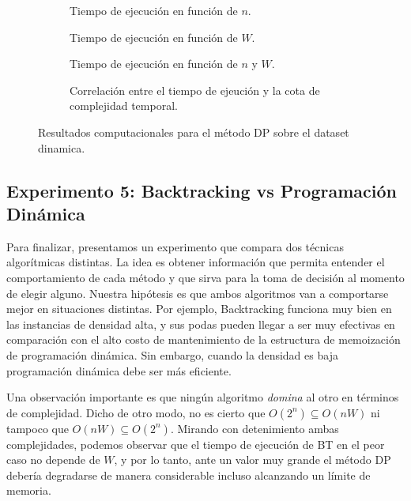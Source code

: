 \documentclass[10pt,a4paper]{article}
\begin{document}
\begin{figure}
    \centering
    \begin{subfigure}{0.45\linewidth}
        \centering
        
        \caption{Tiempo de ejecución en función de $n$.}
        \label{fig:dp-n}
    \end{subfigure}
    \begin{subfigure}{0.45\linewidth}
        \centering
        
        \caption{Tiempo de ejecución en función de $W$.}
        \label{fig:dp-W}
    \end{subfigure}
    \begin{subfigure}{0.45\linewidth}
        \centering
        
        \caption{Tiempo de ejecución en función de $n$ y $W$.}
        \label{fig:dp-NW}
    \end{subfigure}
    \begin{subfigure}{0.45\linewidth}
        \centering
        
        \caption{Correlación entre el tiempo de ejeución y la cota de complejidad temporal.}
        \label{fig:dp-complejidad}
    \end{subfigure}
    \caption{Resultados computacionales para el método DP sobre el dataset dinamica.}
    \label{fig:dp-tiempos}
\end{figure}

\subsection{Experimento 5: Backtracking vs Programación Dinámica}
Para finalizar, presentamos un experimento que compara dos técnicas algorítmicas distintas. La idea es obtener información que permita entender el comportamiento de cada método y que sirva para la toma de decisión al momento de elegir alguno. Nuestra hipótesis es que ambos algoritmos van a comportarse mejor en situaciones distintas. Por ejemplo, Backtracking funciona muy bien en las instancias de densidad alta, y sus podas pueden llegar a ser muy efectivas en comparación con el alto costo de mantenimiento de la estructura de memoización de programación dinámica. Sin embargo, cuando la densidad es baja programación dinámica debe ser más eficiente. 

Una observación importante es que ningún algoritmo \emph{domina} al otro en términos de complejidad. Dicho de otro modo, no es cierto que $O(2^n) \subseteq O(nW)$ ni tampoco que $O(nW) \subseteq O(2^n)$. Mirando con detenimiento ambas complejidades, podemos observar que el tiempo de ejecución de BT en el peor caso no depende de $W$, y por lo tanto, ante un valor muy grande el método DP debería degradarse de manera considerable incluso alcanzando un límite de memoria.
\end{document}
